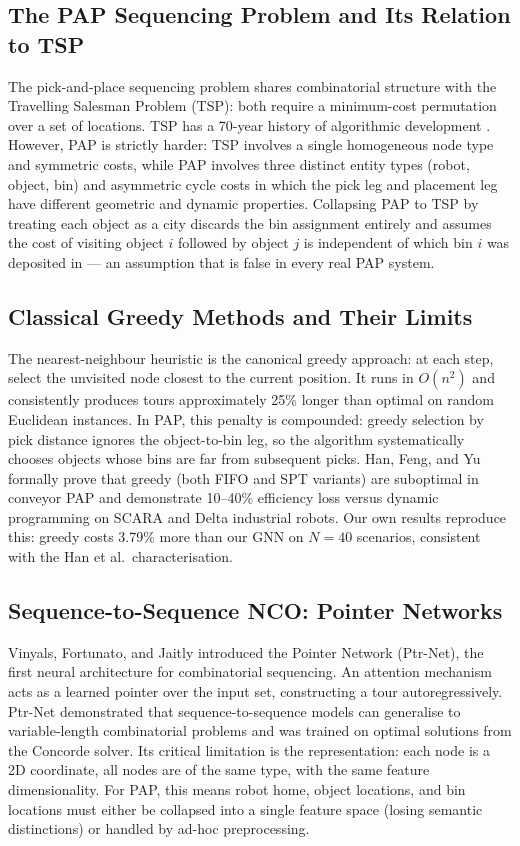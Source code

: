 \documentclass[conference]{IEEEtran}
\begin{document}
\subsection{The PAP Sequencing Problem and Its Relation to TSP}

The pick-and-place sequencing problem shares combinatorial structure with the Travelling Salesman Problem (TSP): both require a minimum-cost permutation over a set of locations. TSP has a 70-year history of algorithmic development \cite{dantzig1954}. However, PAP is strictly harder: TSP involves a single homogeneous node type and symmetric costs, while PAP involves three distinct entity types (robot, object, bin) and asymmetric cycle costs in which the pick leg and placement leg have different geometric and dynamic properties. Collapsing PAP to TSP by treating each object as a city discards the bin assignment entirely and assumes the cost of visiting object $i$ followed by object $j$ is independent of which bin $i$ was deposited in --- an assumption that is false in every real PAP system.

\subsection{Classical Greedy Methods and Their Limits}

The nearest-neighbour heuristic \cite{rosenkrantz1977} is the canonical greedy approach: at each step, select the unvisited node closest to the current position. It runs in $O(n^2)$ and consistently produces tours approximately 25\% longer than optimal on random Euclidean instances. In PAP, this penalty is compounded: greedy selection by pick distance ignores the object-to-bin leg, so the algorithm systematically chooses objects whose bins are far from subsequent picks. Han, Feng, and Yu \cite{han2019pap} formally prove that greedy (both FIFO and SPT variants) are suboptimal in conveyor PAP and demonstrate 10--40\% efficiency loss versus dynamic programming on SCARA and Delta industrial robots. Our own results reproduce this: greedy costs 3.79\% more than our GNN on $N{=}40$ scenarios, consistent with the Han et al.\ characterisation.

\subsection{Sequence-to-Sequence NCO: Pointer Networks}

Vinyals, Fortunato, and Jaitly \cite{vinyals2015pointer} introduced the Pointer Network (Ptr-Net), the first neural architecture for combinatorial sequencing. An attention mechanism acts as a learned pointer over the input set, constructing a tour autoregressively. Ptr-Net demonstrated that sequence-to-sequence models can generalise to variable-length combinatorial problems and was trained on optimal solutions from the Concorde solver. Its critical limitation is the representation: each node is a 2D coordinate, all nodes are of the same type, with the same feature dimensionality. For PAP, this means robot home, object locations, and bin locations must either be collapsed into a single feature space (losing semantic distinctions) or handled by ad-hoc preprocessing.
\end{document}
